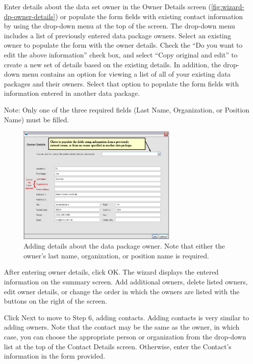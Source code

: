 Enter details about the data set owner in the Owner Details screen
(\autoref{fig:wizard-dp-owner-details}) or populate the form fields with
existing contact information by using the drop-down menu at the top of
the screen. The drop-down menu includes a list of previously entered
data package owners. Select an existing owner to populate the form with
the owner details. Check the ``Do you want to edit the above
information'' check box, and select ``Copy original and edit'' to create
a new set of details based on the existing details. In addition, the
drop-down menu contains an option for viewing a list of all of your
existing data packages and their owners. Select that option to populate
the form fields with information entered in another data package. 

Note: Only one of the three required fields (Last Name, Organization, or
Position Name) must be filled. 

\begin{figure}
  \centering
    \includegraphics[width=0.7\textwidth]{images/wizard-dp-owner-details.jpg}
  \caption{Adding details about the data package owner. Note that either
    the owner's last name, organization, or position name is required.}
  \label{fig:wizard-dp-owner-details}
\end{figure}

After entering owner details, click OK. The wizard displays the entered
information on the summary screen. Add additional owners, delete listed
owners, edit owner details, or change the order in which the owners are
listed with the buttons on the right of the screen. 

Click Next to move to Step 6, adding contacts. Adding contacts is very
similar to adding owners. Note that the contact may be the same as the
owner, in which case, you can choose the appropriate person or
organization from the drop-down list at the top of the Contact Details
screen. Otherwise, enter the Contact's information in the form provided.

